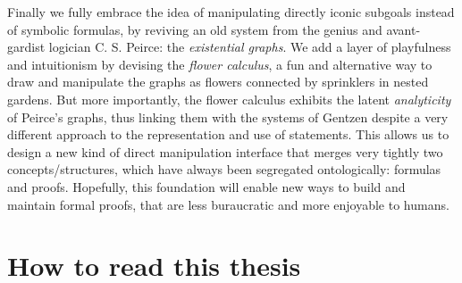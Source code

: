 Finally we fully embrace the idea of manipulating directly iconic subgoals
instead of symbolic formulas, by reviving an old system from the genius and
avant-gardist logician C. S. Peirce: the \emph{existential graphs}. We add a
layer of playfulness and intuitionism by devising the \emph{flower calculus}, a
fun and alternative way to draw and manipulate the graphs as flowers connected
by sprinklers in nested gardens. But more importantly, the flower calculus
exhibits the latent \emph{analyticity} of Peirce's graphs, thus linking them
with the systems of Gentzen despite a very different approach to the
representation and use of statements. This allows us to design a new kind of
direct manipulation interface that merges very tightly two concepts/structures,
which have always been segregated ontologically: formulas and proofs. Hopefully,
this foundation will enable new ways to build and maintain formal proofs, that
are less buraucratic and more enjoyable to humans.


\section{How to read this thesis}


